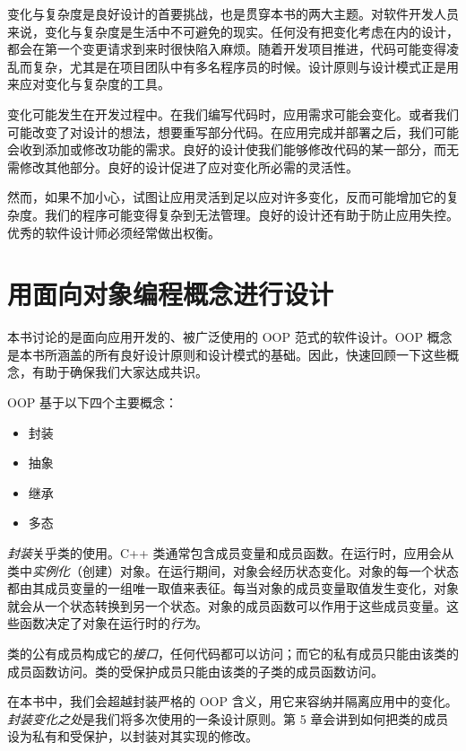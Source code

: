 变化与复杂度是良好设计的首要挑战，也是贯穿本书的两大主题。对软件开发人员来说，变化与复杂度是生活中不可避免的现实。任何没有把变化考虑在内的设计，都会在第一个变更请求到来时很快陷入麻烦。随着开发项目推进，代码可能变得凌乱而复杂，尤其是在项目团队中有多名程序员的时候。设计原则与设计模式正是用来应对变化与复杂度的工具。

变化可能发生在开发过程中。在我们编写代码时，应用需求可能会变化。或者我们可能改变了对设计的想法，想要重写部分代码。在应用完成并部署之后，我们可能会收到添加或修改功能的需求。良好的设计使我们能够修改代码的某一部分，而无需修改其他部分。良好的设计促进了应对变化所必需的灵活性。

然而，如果不加小心，试图让应用灵活到足以应对许多变化，反而可能增加它的复杂度。我们的程序可能变得复杂到无法管理。良好的设计还有助于防止应用失控。优秀的软件设计师必须经常做出权衡。

\section{用面向对象编程概念进行设计}

本书讨论的是面向应用开发的、被广泛使用的 OOP 范式的软件设计。OOP 概念是本书所涵盖的所有良好设计原则和设计模式的基础。因此，快速回顾一下这些概念，有助于确保我们大家达成共识。

OOP 基于以下四个主要概念：

\begin{itemize}
\item 封装
\item 抽象
\item 继承
\item 多态
\end{itemize}

\emph{封装}关乎类的使用。C++ 类通常包含成员变量和成员函数。在运行时，应用会从类中\emph{实例化}（创建）对象。在运行期间，对象会经历状态变化。对象的每一个状态都由其成员变量的一组唯一取值来表征。每当对象的成员变量取值发生变化，对象就会从一个状态转换到另一个状态。对象的成员函数可以作用于这些成员变量。这些函数决定了对象在运行时的\emph{行为}。

类的公有成员构成它的\emph{接口}，任何代码都可以访问；而它的私有成员只能由该类的成员函数访问。类的受保护成员只能由该类的子类的成员函数访问。

在本书中，我们会超越封装严格的 OOP 含义，用它来容纳并隔离应用中的变化。\emph{封装变化之处}是我们将多次使用的一条设计原则。第 5 章会讲到如何把类的成员设为私有和受保护，以封装对其实现的修改。


